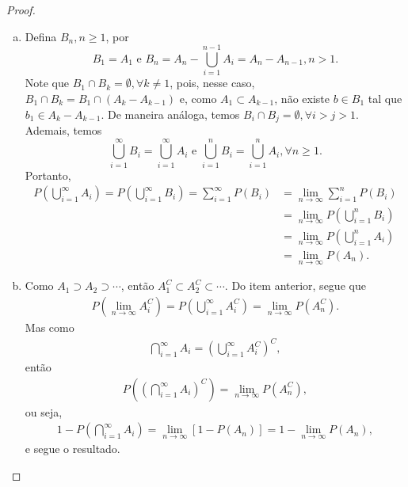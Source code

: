 \documentclass[../Notas.tex]{subfiles}
\begin{document}
\begin{proof}
\begin{enumerate}[(a)]
    \item Defina $B_n, n\geq 1$, por
    $$
    B_1 = A_1 \text{ e } B_n = A_n - \bigcup_{i=1}^{n-1}A_i = A_n - A_{n-1}, n > 1.
    $$
    Note que $B_1 \cap B_k = \emptyset, \forall k\neq 1$, pois, nesse caso, $B_1 \cap B_k = B_1\cap (A_k - A_{k-1})$ e, como $A_1 \subset A_{k-1}$, não existe $b\in B_1$ tal que $b_1\in A_k - A_{k-1}$. De maneira análoga, temos $B_i\cap B_j = \emptyset, \forall i > j > 1$. Ademais, temos
    $$
    \bigcup_{i=1}^{\infty}B_i = \bigcup_{i=1}^{\infty}A_i \text{ e } \bigcup_{i=1}^{n} B_i = \bigcup_{i=1}^{n}A_i, \forall n\geq 1.
    $$
    Portanto, 
    \begin{align*}
        P\left( \bigcup_{i=1}^{\infty}A_i \right) = P\left( \bigcup_{i=1}^{\infty}B_i \right) = \sum_{i=1}^{\infty}P(B_i) 
        &= \lim_{n\to\infty}\sum_{i=1}^{n}P(B_i) \\
        &= \lim_{n\to\infty} P\left( \bigcup_{i=1}^{n}B_i \right) \\
        &= \lim_{n\to\infty} P\left( \bigcup_{i=1}^{n}A_i \right) \\
        &= \lim_{n\to\infty}P(A_n).
    \end{align*}
    
    \item Como $A_1 \supset A_2 \supset \cdots$, então $A_1^C \subset A_2^C \subset \cdots $. Do item anterior, segue que
    \begin{align*}
        P\left( \lim_{n\to\infty} A_i^C \right) = P\left( \bigcup_{i=1}^{\infty}A_i^C \right) = \lim_{n\to\infty} P(A_n^C).
    \end{align*}
    Mas como
    \begin{align*}
        \bigcap_{i=1}^{\infty}A_i = \left( \bigcup_{i=1}^{\infty}A_i^C \right)^C,
    \end{align*}
    então
    \begin{align*}
        P\left( \left( \bigcap_{i=1}^{\infty}A_i \right)^C \right) = \lim_{n\to\infty} P(A_n^C),
    \end{align*}
    ou seja,
    \begin{align*}
        1 - P\left( \bigcap_{i=1}^{\infty}A_i \right) = \lim_{n\to\infty}\left[ 1 - P(A_n) \right] = 1 - \lim_{n\to\infty} P(A_n),
    \end{align*}
    e segue o resultado.
\end{enumerate}
\end{proof}
\end{document}
